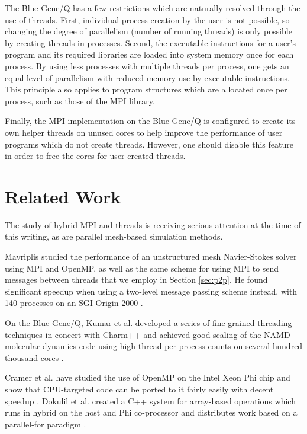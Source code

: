 \documentclass[final,1p,times]{elsarticle}
\begin{document}
The Blue Gene/Q has a few restrictions which are naturally resolved
through the use of threads.
First, individual process creation by the user is not possible, so
changing the degree of parallelism (number of running threads)
is only possible by creating threads in processes.
Second, the executable instructions for a user's program and its
required libraries are loaded into system memory once for each process.
By using less processes with multiple threads per process, one gets
an equal level of parallelism with reduced memory use by executable
instructions.
This principle also applies to program structures which are allocated
once per process, such as those of the MPI library.

Finally, the MPI implementation on the Blue Gene/Q is configured to
create its own helper threads on unused cores to help improve
the performance of user programs which do not create threads.
However, one should disable this feature in order to free the cores for
user-created threads.

\section{Related Work}
\label{sec:related}

The study of hybrid MPI and threads is receiving serious attention
at the time of this writing, as are parallel mesh-based simulation
methods.

Mavriplis studied the performance of an unstructured mesh
Navier-Stokes solver using MPI and OpenMP, as well as the same
scheme for using MPI to send messages between threads that
we employ in Section \ref{sec:p2p}.
He found significant speedup when using a two-level message
passing scheme instead, with 140 processes on an SGI-Origin 2000
\cite{mavriplis2002parallel}.

On the Blue Gene/Q, Kumar et al. developed a series of fine-grained
threading techniques in concert with Charm++ and achieved good
scaling of the NAMD molecular dynamics code using high thread
per process counts on several hundred thousand cores
\cite{kumar2013acceleration}.

Cramer et al. have studied the use of OpenMP on the Intel Xeon Phi
chip and show that CPU-targeted code can be ported to it fairly
easily with decent speedup \cite{cramer2012openmp}.
Dokulil et al. created a C++ system for array-based operations
which runs in hybrid on the host and Phi co-processor and distributes
work based on a parallel-for paradigm \cite{Dokulil20132508}.
\end{document}
